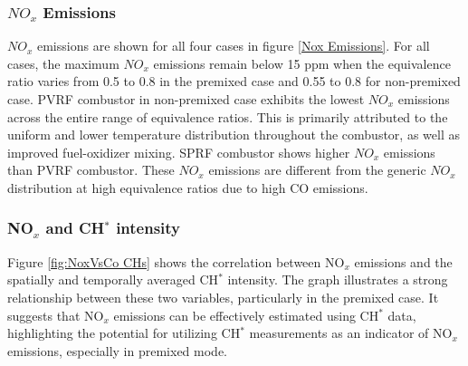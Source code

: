 \subsubsection{$NO_x$ Emissions }
$NO_x$ emissions are shown for all four cases in figure \ref{Nox Emissions}. For all cases, the maximum $NO_x$ emissions remain below 15 ppm when the equivalence ratio varies from 0.5 to 0.8 in the premixed case and 0.55 to 0.8 for non-premixed case. PVRF combustor in non-premixed case exhibits the lowest $NO_x$ emissions across the entire range of equivalence ratios. This is primarily attributed to the uniform and lower temperature distribution throughout the combustor, as well as improved fuel-oxidizer mixing. SPRF combustor shows higher $NO_x$ emissions than PVRF combustor. These $NO_x$ emissions are different from the generic $NO_x$ distribution at high equivalence ratios due to high CO emissions. 

\subsubsection{NO$_x$ and CH$^*$ intensity} Figure \ref{fig:NoxVsCo CHs} shows the correlation between NO$_x$ emissions and the spatially and temporally averaged CH$^*$ intensity. The graph illustrates a strong relationship between these two variables, particularly in the premixed case. It suggests that NO$_x$ emissions can be effectively estimated using CH$^*$ data, highlighting the potential for utilizing CH$^*$ measurements as an indicator of NO$_x$ emissions, especially in premixed mode.

